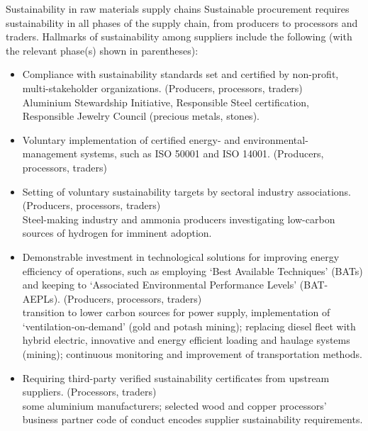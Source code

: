 \documentclass[../SustainableHEP.tex]{subfiles}
\begin{document}
\begin{bestpractice}{Sustainability in raw materials supply chains}%
\noindent Sustainable procurement requires sustainability in all phases of the supply chain, from producers to processors and traders.  Hallmarks of sustainability among suppliers include the following (with the relevant phase(s) shown in parentheses):
\begin{itemize}
    \item Compliance with sustainability standards set and certified by non-profit, multi-stakeholder organizations. (Producers, processors, traders) \\\vspace{-0.1in} 
    {\small \eg Aluminium Stewardship Initiative, Responsible Steel certification, Responsible Jewelry Council (precious metals, stones).}
    \item Voluntary implementation of certified energy- and environmental-management systems, such as ISO 50001 and ISO 14001. (Producers, processors, traders)  
    \item Setting of voluntary sustainability targets by sectoral industry associations. (Producers, processors, traders) \\
    {\small \eg Steel-making industry and ammonia producers investigating low-carbon sources of hydrogen for imminent adoption.}
    \item Demonstrable investment in technological solutions for improving energy efficiency of operations, such as employing `Best Available Techniques' (BATs) and keeping to `Associated Environmental Performance Levels' (BAT-AEPLs). (Producers, processors, traders) \\ 
    {\small \eg transition to lower carbon sources for power supply, implementation of `ventilation-on-demand' (gold and potash mining); replacing diesel fleet with hybrid electric, innovative and energy efficient loading and haulage systems (mining); continuous monitoring and improvement of transportation methods.}
    \item Requiring third-party verified sustainability certificates from upstream suppliers. (Processors, traders) \\
    {\small \eg some aluminium manufacturers; selected wood and copper processors' business partner code of conduct encodes supplier sustainability requirements.}
\end{itemize}
\end{bestpractice}
\end{document}
